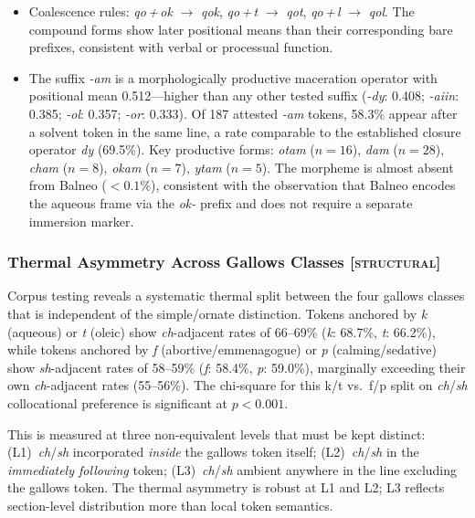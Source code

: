 \documentclass[11pt,a4paper]{article}
\newcommand{\structural}{\textsc{[structural]}}
\begin{document}
\begin{itemize}[leftmargin=2em]
\item Coalescence rules: \textit{qo\,+\,ok} $\rightarrow$ \textit{qok}, \textit{qo\,+\,t} $\rightarrow$ \textit{qot}, \textit{qo\,+\,l} $\rightarrow$ \textit{qol}. The compound forms show later positional means than their corresponding bare prefixes, consistent with verbal or processual function.

\item The suffix \textit{-am} is a morphologically productive maceration operator with positional mean 0.512---higher than any other tested suffix (\textit{-dy}: 0.408; \textit{-aiin}: 0.385; \textit{-ol}: 0.357; \textit{-or}: 0.333). Of 187 attested \textit{-am} tokens, 58.3\% appear after a solvent token in the same line, a rate comparable to the established closure operator \textit{dy} (69.5\%). Key productive forms: \textit{otam} ($n=16$), \textit{dam} ($n=28$), \textit{cham} ($n=8$), \textit{okam} ($n=7$), \textit{ytam} ($n=5$). The morpheme is almost absent from Balneo ($<0.1\%$), consistent with the observation that Balneo encodes the aqueous frame via the \textit{ok-} prefix and does not require a separate immersion marker.
\end{itemize}

\subsubsection{Thermal Asymmetry Across Gallows Classes \structural{}}

Corpus testing reveals a systematic thermal split between the four gallows classes that is independent of the simple/ornate distinction. Tokens anchored by \textit{k} (aqueous) or \textit{t} (oleic) show \textit{ch}-adjacent rates of 66--69\% (\textit{k}: 68.7\%, \textit{t}: 66.2\%), while tokens anchored by \textit{f} (abortive/emmenagogue) or \textit{p} (calming/sedative) show \textit{sh}-adjacent rates of 58--59\% (\textit{f}: 58.4\%, \textit{p}: 59.0\%), marginally exceeding their own \textit{ch}-adjacent rates (55--56\%). The chi-square for this k/t vs.\ f/p split on \textit{ch}/\textit{sh} collocational preference is significant at $p < 0.001$.

This is measured at three non-equivalent levels that must be kept distinct: (L1)~\textit{ch}/\textit{sh} incorporated \emph{inside} the gallows token itself; (L2)~\textit{ch}/\textit{sh} in the \emph{immediately following} token; (L3)~\textit{ch}/\textit{sh} ambient anywhere in the line excluding the gallows token. The thermal asymmetry is robust at L1 and L2; L3 reflects section-level distribution more than local token semantics.
\end{document}
